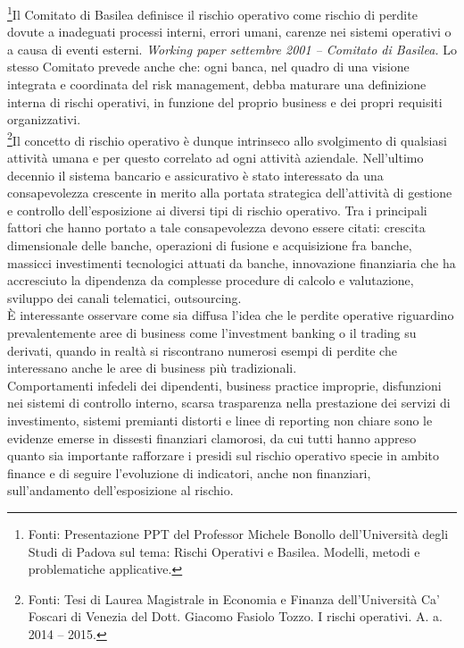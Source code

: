 \documentclass[titlepage]{article}
\begin{document}
\footnote{Fonti: Presentazione PPT del Professor Michele Bonollo dell’Università degli Studi di Padova sul tema: Rischi Operativi e Basilea. Modelli, metodi e problematiche applicative.}Il Comitato di Basilea definisce il rischio operativo come rischio di perdite dovute a inadeguati processi interni, errori umani, carenze nei sistemi operativi o a causa di eventi esterni. \textit{Working paper settembre 2001 –  Comitato di Basilea.} Lo stesso Comitato prevede anche che: ogni banca, nel quadro di una visione integrata e coordinata del risk management, debba maturare una definizione interna di rischi operativi, in funzione del proprio business e dei propri requisiti organizzativi.\\
\footnote{Fonti: Tesi di Laurea Magistrale in Economia e Finanza dell’Università Ca’ Foscari di Venezia del Dott. Giacomo Fasiolo Tozzo. I rischi operativi. A. a. 2014 – 2015.}Il concetto di rischio operativo è dunque intrinseco allo svolgimento di qualsiasi attività umana e per questo correlato ad ogni attività aziendale. Nell’ultimo decennio il sistema bancario e assicurativo è stato interessato da una consapevolezza crescente in merito alla portata strategica dell’attività di gestione e controllo dell’esposizione ai diversi tipi di rischio operativo. Tra i principali fattori che hanno portato a tale consapevolezza devono essere citati: crescita dimensionale delle banche, operazioni di fusione e acquisizione fra banche, massicci investimenti tecnologici attuati da banche, innovazione finanziaria che ha accresciuto la dipendenza da complesse procedure di calcolo e valutazione, sviluppo dei canali telematici, outsourcing.\\
È interessante osservare come sia diffusa l’idea che le perdite operative riguardino prevalentemente aree di business come l’investment banking o il trading su derivati, quando in realtà si riscontrano numerosi esempi di perdite che interessano anche le aree di business più tradizionali. 
\\
Comportamenti infedeli dei dipendenti, business practice improprie, disfunzioni nei sistemi di controllo interno, scarsa trasparenza nella prestazione dei servizi di investimento, sistemi premianti distorti e linee di reporting non chiare sono le evidenze emerse in dissesti finanziari clamorosi, da cui tutti hanno appreso quanto sia importante rafforzare i presidi sul rischio operativo specie in ambito finance e di seguire l’evoluzione di indicatori, anche non finanziari, sull’andamento dell’esposizione al rischio. 
\\
\end{document}
